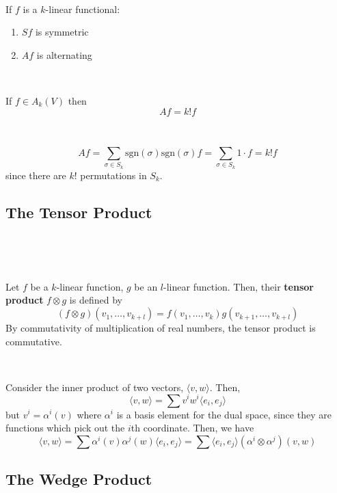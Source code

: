 \documentclass{article}
\begin{document}
\begin{proposition}
  \

  If $f$ is a $k$-linear functional:

  \begin{enumerate}
    \item $Sf$ is symmetric
    \item $Af$ is alternating
  \end{enumerate}
\end{proposition}

\begin{proposition}
  \

  If $f \in A_k(V)$ then $$Af = k!f$$
\end{proposition}

\begin{customproof}
  \

  $$Af = \sum_{\sigma \in S_k} \text{sgn}(\sigma)\text{sgn}(\sigma) f = \sum_{\sigma \in S_k} 1 \cdot f = k!f$$since there are $k!$ permutations in $S_k$.
\end{customproof}

\subsection{The Tensor Product}
\

\begin{definition}
  \

  Let $f$ be a $k$-linear function, $g$ be an $l$-linear function. Then, their \textbf{tensor product} $f\otimes g$ is defined by $$(f \otimes g)(v_1, \dots, v_{k+l}) = f(v_1, \dots, v_k)g(v_{k+1},\dots,v_{k+l})$$By commutativity of multiplication of real numbers, the tensor product is commutative.
\end{definition}

\begin{example}
  \

  Consider the inner product of two vectors, $\langle v, w \rangle$. Then, $$\langle v, w\rangle = \sum v^iw^i\langle e_i, e_j\rangle$$but $v^i = \alpha^i(v)$ where $\alpha^i$ is a basis element for the dual space, since they are functions which pick out the $i$th coordinate. Then, we have $$\langle v,w \rangle = \sum \alpha^i(v) \alpha^j(w)\langle e_i, e_j \rangle = \sum \langle e_i, e_j\rangle (\alpha^i \otimes\alpha^j)(v,w)$$
\end{example}

\subsection{The Wedge Product}
\
\end{document}
